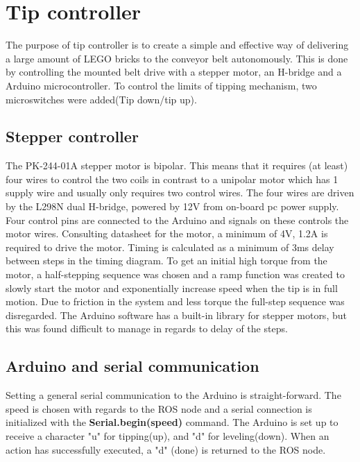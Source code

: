 \section{Tip controller} %
\label{sec:mr_tip_controller}

The purpose of tip controller is to create a simple and effective way of 
delivering a large amount of LEGO bricks to the conveyor belt autonomously. 
This is done by controlling the mounted belt drive with a stepper motor, an 
H-bridge and a Arduino microcontroller. To control the limits of tipping 
mechanism, two microswitches were added(Tip down/tip up).\\

\subsection{Stepper controller} %
\label{sub:stepper_controller}
The PK-244-01A stepper motor is bipolar. This means that it requires (at least) 
four wires to control the two coils in contrast to a unipolar motor which has 1 
supply wire and usually only requires two control wires. 
The four wires are driven by the L298N dual 
H-bridge, powered by 12V from on-board pc power supply. Four control pins are 
connected to the 
Arduino and signals on these controls the motor wires. Consulting datasheet for 
the motor, a minimum of 4V, 1.2A is required to drive the motor. Timing is 
calculated as a minimum of 
3ms delay between steps in the timing diagram. To get an initial high torque 
from the motor, a half-stepping sequence was chosen and a ramp function was 
created to slowly start the motor and exponentially increase speed when the 
tip is in full motion. Due to friction in the system and less torque the 
full-step sequence was disregarded. The Arduino software has a built-in library 
for stepper motors, but this was found difficult to manage in regards to delay 
of the steps. 

\subsection{Arduino and serial communication} %
\label{sub:arduino_and_serial_communication}
Setting a general serial communication to the Arduino is straight-forward. The 
speed is chosen with regards to the ROS node and a serial connection is 
initialized with the \textbf{Serial.begin(speed)} command. The Arduino is set 
up to 
receive a character "u" for tipping(up), and "d" for leveling(down). When an 
action has successfully executed, a "d" (done) is returned to the ROS node.


